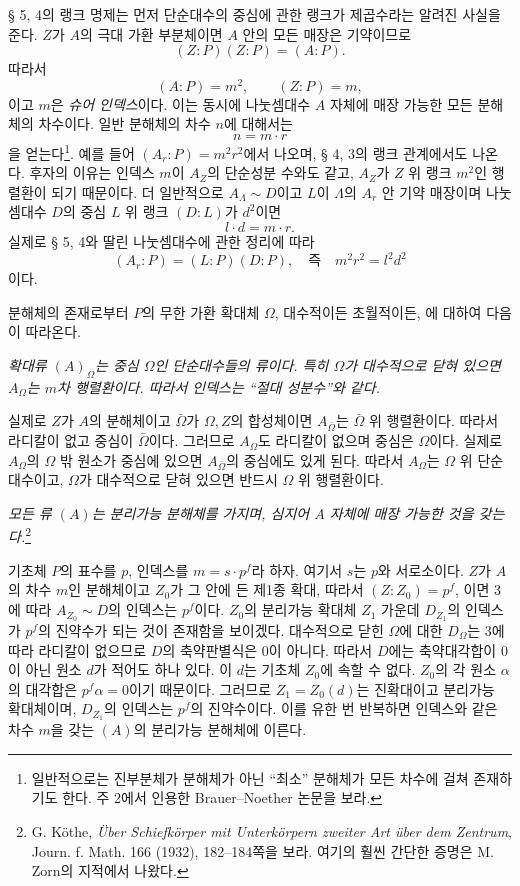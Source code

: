 \medskip
\noindent\textbf{}\quad § 5, 4의 랭크 명제는 먼저 단순대수의 중심에 관한 랭크가 제곱수라는 알려진 사실을 준다. \(Z\)가 \(A\)의 극대 가환 부분체이면 \(A\) 안의 모든 매장은 기약이므로
\[
(Z:P)(Z:P)=(A:P).
\]
따라서
\[
(A:P)=m^2,\qquad(Z:P)=m,
\]
이고 \(m\)은 \emph{슈어 인덱스}이다. 이는 동시에 나눗셈대수 \(A\) 자체에 매장 가능한 모든 분해체의 차수이다. 일반 분해체의 차수 \(n\)에 대해서는
\[
n=m\cdot r
\]
을 얻는다\footnote{일반적으로는 진부분체가 분해체가 아닌 “최소” 분해체가 모든 차수에 걸쳐 존재하기도 한다. 주 2에서 인용한 Brauer--Noether 논문을 보라.}. 예를 들어 \((A_r:P)=m^2r^2\)에서 나오며, § 4, 3의 랭크 관계에서도 나온다. 후자의 이유는 인덱스 \(m\)이 \(A_Z\)의 단순성분 수와도 같고, \(A_Z\)가 \(Z\) 위 랭크 \(m^2\)인 행렬환이 되기 때문이다. 더 일반적으로 \(A_\Lambda\sim D\)이고 \(L\)이 \(\Lambda\)의 \(A_r\) 안 기약 매장이며 나눗셈대수 \(D\)의 중심 \(L\) 위 랭크 \((D:L)\)가 \(d^2\)이면
\[
l\cdot d=m\cdot r.
\]
실제로 § 5, 4와 딸린 나눗셈대수에 관한 정리에 따라
\[
(A_r:P)=(L:P)(D:P),
\quad\text{즉}\quad m^2r^2=l^2d^2
\]
이다.

분해체의 존재로부터 \(P\)의 무한 가환 확대체 \(\Omega\), 대수적이든 초월적이든, 에 대하여 다음이 따라온다.

\noindent\emph{확대류 \((A)_\Omega\)는 중심 \(\Omega\)인 단순대수들의 류이다. 특히 \(\Omega\)가 대수적으로 닫혀 있으면 \(A_\Omega\)는 \(m\)차 행렬환이다. 따라서 인덱스는 “절대 성분수”와 같다.}

실제로 \(Z\)가 \(A\)의 분해체이고 \(\bar\Omega\)가 \(\Omega,Z\)의 합성체이면 \(A_{\bar\Omega}\)는 \(\bar\Omega\) 위 행렬환이다. 따라서 라디칼이 없고 중심이 \(\bar\Omega\)이다. 그러므로 \(A_\Omega\)도 라디칼이 없으며 중심은 \(\Omega\)이다. 실제로 \(A_\Omega\)의 \(\Omega\) 밖 원소가 중심에 있으면 \(A_{\bar\Omega}\)의 중심에도 있게 된다. 따라서 \(A_\Omega\)는 \(\Omega\) 위 단순대수이고, \(\Omega\)가 대수적으로 닫혀 있으면 반드시 \(\Omega\) 위 행렬환이다.

\medskip
\noindent\textbf{}\quad
\emph{모든 류 \((A)\)는 분리가능 분해체를 가지며, 심지어 \(A\) 자체에 매장 가능한 것을 갖는다.}\footnote{G. Köthe, \emph{Über Schiefkörper mit Unterkörpern zweiter Art über dem Zentrum}, Journ. f. Math. 166 (1932), 182--184쪽을 보라. 여기의 훨씬 간단한 증명은 M. Zorn의 지적에서 나왔다.}

기초체 \(P\)의 표수를 \(p\), 인덱스를 \(m=s\cdot p^f\)라 하자. 여기서 \(s\)는 \(p\)와 서로소이다. \(Z\)가 \(A\)의 차수 \(m\)인 분해체이고 \(Z_0\)가 그 안에 든 제1종 확대, 따라서 \((Z:Z_0)=p^f\), 이면 3에 따라 \(A_{Z_0}\sim D\)의 인덱스는 \(p^f\)이다. \(Z_0\)의 분리가능 확대체 \(Z_1\) 가운데 \(D_{Z_1}\)의 인덱스가 \(p^f\)의 진약수가 되는 것이 존재함을 보이겠다. 대수적으로 닫힌 \(\Omega\)에 대한 \(D_\Omega\)는 3에 따라 라디칼이 없으므로 \(D\)의 축약판별식은 0이 아니다. 따라서 \(D\)에는 축약대각합이 0이 아닌 원소 \(d\)가 적어도 하나 있다. 이 \(d\)는 기초체 \(Z_0\)에 속할 수 없다. \(Z_0\)의 각 원소 \(\alpha\)의 대각합은 \(p^f\alpha=0\)이기 때문이다. 그러므로 \(Z_1=Z_0(d)\)는 진확대이고 분리가능 확대체이며, \(D_{Z_1}\)의 인덱스는 \(p^f\)의 진약수이다. 이를 유한 번 반복하면 인덱스와 같은 차수 \(m\)을 갖는 \((A)\)의 분리가능 분해체에 이른다.

